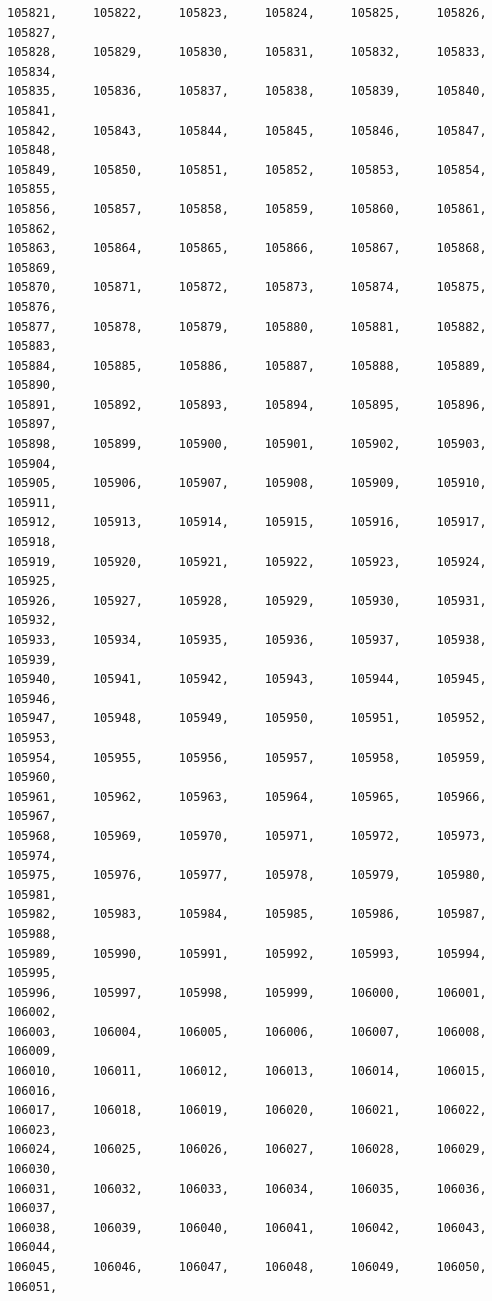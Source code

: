 \documentclass[a4paper,11pt]{report}
\begin{document}
\begin{verbatim}
105821,     105822,     105823,     105824,     105825,     105826,     105827,
105828,     105829,     105830,     105831,     105832,     105833,     105834,
105835,     105836,     105837,     105838,     105839,     105840,     105841,
105842,     105843,     105844,     105845,     105846,     105847,     105848,
105849,     105850,     105851,     105852,     105853,     105854,     105855,
105856,     105857,     105858,     105859,     105860,     105861,     105862,
105863,     105864,     105865,     105866,     105867,     105868,     105869,
105870,     105871,     105872,     105873,     105874,     105875,     105876,
105877,     105878,     105879,     105880,     105881,     105882,     105883,
105884,     105885,     105886,     105887,     105888,     105889,     105890,
105891,     105892,     105893,     105894,     105895,     105896,     105897,
105898,     105899,     105900,     105901,     105902,     105903,     105904,
105905,     105906,     105907,     105908,     105909,     105910,     105911,
105912,     105913,     105914,     105915,     105916,     105917,     105918,
105919,     105920,     105921,     105922,     105923,     105924,     105925,
105926,     105927,     105928,     105929,     105930,     105931,     105932,
105933,     105934,     105935,     105936,     105937,     105938,     105939,
105940,     105941,     105942,     105943,     105944,     105945,     105946,
105947,     105948,     105949,     105950,     105951,     105952,     105953,
105954,     105955,     105956,     105957,     105958,     105959,     105960,
105961,     105962,     105963,     105964,     105965,     105966,     105967,
105968,     105969,     105970,     105971,     105972,     105973,     105974,
105975,     105976,     105977,     105978,     105979,     105980,     105981,
105982,     105983,     105984,     105985,     105986,     105987,     105988,
105989,     105990,     105991,     105992,     105993,     105994,     105995,
105996,     105997,     105998,     105999,     106000,     106001,     106002,
106003,     106004,     106005,     106006,     106007,     106008,     106009,
106010,     106011,     106012,     106013,     106014,     106015,     106016,
106017,     106018,     106019,     106020,     106021,     106022,     106023,
106024,     106025,     106026,     106027,     106028,     106029,     106030,
106031,     106032,     106033,     106034,     106035,     106036,     106037,
106038,     106039,     106040,     106041,     106042,     106043,     106044,
106045,     106046,     106047,     106048,     106049,     106050,     106051,

\end{verbatim}
\end{document}

